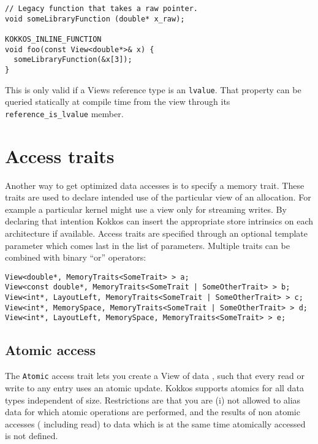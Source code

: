 \begin{lstlisting}
// Legacy function that takes a raw pointer.
void someLibraryFunction (double* x_raw);

KOKKOS_INLINE_FUNCTION
void foo(const View<double*>& x) {
  someLibraryFunction(&x[3]);
}
\end{lstlisting}

This is only valid if a Views reference type is an \lstinline|lvalue|.
That property can be queried statically at compile time from the view through
its \lstinline|reference_is_lvalue| member. 



\section{Access traits}\label{S:View:AccessTraits}


Another way to get optimized data accesses is to specify a memory trait. 
These traits are used to declare intended use of the particular view of 
an allocation. For example a particular kernel might use a view only for 
streaming writes. By declaring that intention Kokkos can insert the 
appropriate store intrinsics on each architecture if available. Access traits
are specified through an optional template parameter which comes last in the list
of parameters. Multiple traits can be combined with binary ``or'' operators: 

\begin{lstlisting}
View<double*, MemoryTraits<SomeTrait> > a;
View<const double*, MemoryTraits<SomeTrait | SomeOtherTrait> > b;
View<int*, LayoutLeft, MemoryTraits<SomeTrait | SomeOtherTrait> > c;
View<int*, MemorySpace, MemoryTraits<SomeTrait | SomeOtherTrait> > d;
View<int*, LayoutLeft, MemorySpace, MemoryTraits<SomeTrait> > e;
\end{lstlisting}

\subsection{Atomic access}

The \lstinline!Atomic! access trait lets you create a View of data , such that every
read or write to any entry uses an atomic update. Kokkos supports atomics for 
all data types independent of size. Restrictions are that you are (i) not allowed to alias data
for which atomic operations are performed, and the results of non atomic accesses (
including read) to data which is at the same time atomically accessed is not defined. 

